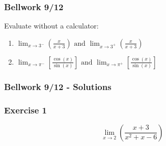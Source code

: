 \documentclass[12pt]{beamer}
\begin{document}
\begin{frame}
	\frametitle{Bellwork 9/12}
	\vspace*{\fill}
	\vspace*{\fill}
	\initclock
	Evaluate without a calculator:\\
	\vspace*{\fill}
	\begin{center}
		\large
		\begin{minipage}{0.75\textwidth}
			\begin{enumerate}
				\item $\displaystyle\lim_{x\to3^{-}}\left(\frac{x}{x+3}\right) \text{ and } \displaystyle\lim_{x\to3^{+}}\left(\frac{x}{x+3}\right)$
				\item $\displaystyle\lim_{x\to\pi^{-}}\left[\frac{\cos(x)}{\sin(x)}\right] \text{ and } \displaystyle\lim_{x\to\pi^{+}}\left[\frac{\cos(x)}{\sin(x)}\right]$
			\end{enumerate}
		\end{minipage}
	\end{center}
	\vspace*{\fill}
	\vspace*{\fill}
	\vspace*{\fill}
	\vspace*{\fill}
	\crono
\end{frame}
\begin{frame}
	\frametitle{Bellwork 9/12 - Solutions}

\end{frame}
\begin{frame}
	\frametitle{Exercise 1}
	\vspace*{\fill}
	\vspace*{\fill}
	\vspace*{\fill}
	\initclock
	\Large
	\[\displaystyle\lim_{x\to2}\left(\frac{x+3}{x^2+x-6}\right)\]\\
	\vspace*{\fill}
	\vspace*{\fill}
	\vspace*{\fill}
	\vspace*{\fill}
	\crono
\end{frame}
\end{document}
